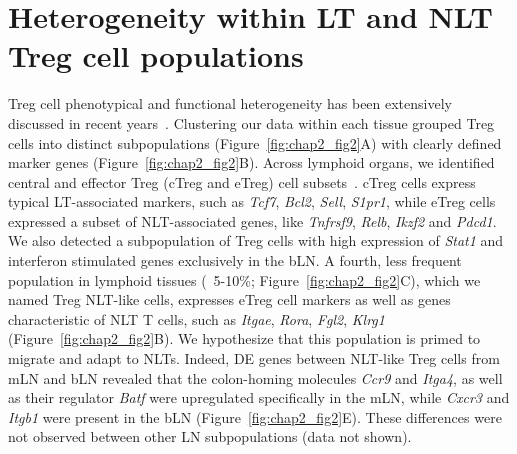 \section{Heterogeneity within LT and NLT Treg cell populations}
\label{section2.3}
Treg cell phenotypical and functional heterogeneity has been extensively discussed in recent years~\citep{Josefowicz2012-nh,Campbell2011-uc}. Clustering our data within each tissue grouped Treg cells into distinct subpopulations (Figure~\ref{fig:chap2_fig2}A) with clearly defined marker genes (Figure~\ref{fig:chap2_fig2}B). Across lymphoid organs, we identified central and effector Treg (cTreg and eTreg) cell subsets~\citep{Cretney2011-zd,Vasanthakumar2015-jw}. cTreg cells express typical LT-associated markers, such as \textit{Tcf7}, \textit{Bcl2}, \textit{Sell}, \textit{S1pr1}, while eTreg cells expressed a subset of NLT-associated genes, like \textit{Tnfrsf9}, \textit{Relb}, \textit{Ikzf2} and \textit{Pdcd1}. We also detected a subpopulation of Treg cells with high expression of \textit{Stat1} and interferon stimulated genes exclusively in the bLN. A fourth, less frequent population in lymphoid tissues (~5-10\%; Figure~\ref{fig:chap2_fig2}C), which we named Treg NLT-like cells, expresses eTreg cell markers as well as genes characteristic of NLT T cells, such as \textit{Itgae}, \textit{Rora}, \textit{Fgl2}, \textit{Klrg1} (Figure~\ref{fig:chap2_fig2}B). We hypothesize that this population is primed to migrate and adapt to NLTs. Indeed, DE genes between NLT-like Treg cells from mLN and bLN revealed that the colon-homing molecules \textit{Ccr9} and \textit{Itga4}, as well as their regulator \textit{Batf} were upregulated specifically in the mLN, while \textit{Cxcr3} and \textit{Itgb1} were present in the bLN (Figure~\ref{fig:chap2_fig2}E). These differences were not observed between other LN subpopulations (data not shown).

